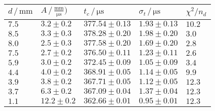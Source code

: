 	\begin{tabular}{|p{2cm}|p{3cm}|p{3cm}|p{3cm}|p{2cm}|}
		\hline
		\rowcolor{tabcolor}
		$d \, / \, \mathrm{mm}$        & $A \, / \, \mathrm{\frac{mm}{\mu s}})$ & 
 			$t_c \, / \, \mathrm{\mu s}$    & $\sigma_t \, / \, \mathrm{\mu s}$ & 
 			$\chi^2 / n_d$ \\ \hline
		$7.5$ & $3.2 \pm 0.2$ & $377.54 \pm 0.13$ & $1.93 \pm 0.13$ & $10.2$\\ 
		$8.5$ & $3.3 \pm 0.3$ & $378.28 \pm 0.20$ & $1.98 \pm 0.20$ & $3.0$\\ 
		$8.0$ & $2.5 \pm 0.3$ & $377.58 \pm 0.20$ & $1.69 \pm 0.20$ & $2.8$\\ 
		$7.5$ & $2.7 \pm 0.2$ & $376.50 \pm 0.11$ & $1.23 \pm 0.11$ & $2.6$\\ 
		$5.9$ & $3.0 \pm 0.2$ & $372.45 \pm 0.09$ & $1.05 \pm 0.09$ & $3.4$\\ 
		$4.4$ & $4.0 \pm 0.2$ & $368.91 \pm 0.05$ & $1.14 \pm 0.05$ & $9.9$\\ 
		$3.9$ & $3.8 \pm 0.2$ & $367.71 \pm 0.05$ & $1.12 \pm 0.05$ & $12.3$\\ 
		$3.7$ & $6.3 \pm 0.2$ & $367.09 \pm 0.04$ & $1.37 \pm 0.04$ & $12.3$\\ 
		$1.1$ & $12.2 \pm 0.2$ & $362.66 \pm 0.01$ & $0.95 \pm 0.01$ & $12.3$\\ 
		\hline
	\end{tabular}

